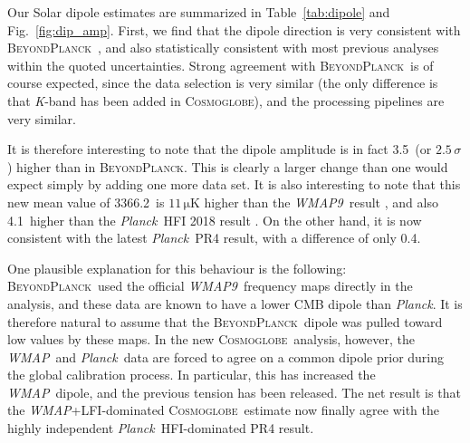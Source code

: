 \documentclass[twocolumn]{../../common/aa}
\def\WMAP{\emph{WMAP}}
\def\WMAPnine{\emph{WMAP9}}
\def\Planck{\emph{Planck}}
\newcommand{\BP}{\textsc{BeyondPlanck}}
\newcommand{\bp}{\textsc{BeyondPlanck}}
\newcommand{\cosmoglobe}{\textsc{Cosmoglobe}}
\newcommand{\K}[0]{\textit K}
\begin{document}
Our Solar dipole estimates are summarized in Table~\ref{tab:dipole} and Fig.~\ref{fig:dip_amp}. First, we find that the dipole direction is very consistent with \bp\ \citep{bp11}, and also statistically consistent with most previous analyses within the quoted uncertainties. Strong agreement with \bp\ is of course expected, since the data selection is very similar (the only difference is that \K-band has been added in \cosmoglobe), and the processing pipelines are very similar.

It is therefore interesting to note that the dipole amplitude is in fact 3.5\muK\ (or $2.5\,\sigma$) higher than in \bp. This is clearly a larger change than one would expect simply by adding one more data set. It is also interesting to note that this new mean value of 3366.2\muK\ is $11\,\mathrm{\mu K}$ higher than the \WMAPnine\ result \citep{hinshaw2009}, and also 4.1\muK\ higher than the \Planck\ HFI 2018 result \citep{planck2016-l02}. On the other hand, it is now consistent with the latest \Planck\ PR4 result, with a difference of only 0.4\muK.



One plausible explanation for this behaviour is the following: \bp\ used the official \WMAPnine\ frequency maps directly in the analysis, and these data are known to have a lower CMB dipole than \Planck. It is therefore natural to assume that the \BP\ dipole was pulled toward low values by these maps. In the new \cosmoglobe\ analysis, however, the \WMAP\ and \Planck\ data are forced to agree on a common dipole prior during the global calibration process. In particular, this has increased the \WMAP\ dipole, and the previous tension has been released. The net result is that the \WMAP+LFI-dominated \cosmoglobe\ estimate now finally agree with the highly independent \Planck\ HFI-dominated PR4 result. 


\end{document}

